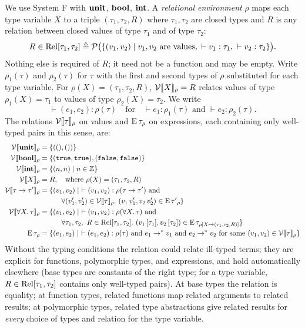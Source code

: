 We use System F with $\mathbf{unit}$, $\mathbf{bool}$, $\mathbf{int}$. A \emph{relational
environment} $\rho$ maps each type variable $X$ to a triple $(\tau_1, \tau_2, R)$ where
$\tau_1, \tau_2$ are closed types and $R$ is any relation between closed values of type
$\tau_1$ and of type $\tau_2$:
\[
R \in \mathrm{Rel}[\tau_1, \tau_2] \triangleq \mathcal{P}\big(\{(v_1, v_2) \mid v_1, v_2 \text{ are values},\ \vdash v_1 : \tau_1,\ \vdash v_2 : \tau_2\}\big).
\]
Nothing else is required of $R$; it need not be a function and may be empty. Write
$\rho_1(\tau)$ and $\rho_2(\tau)$ for $\tau$ with the first and second types of $\rho$
substituted for each type variable. For $\rho(X) = (\tau_1, \tau_2, R)$,
$\mathcal{V}[\![X]\!]_\rho = R$ relates values of type $\rho_1(X) = \tau_1$ to values of type
$\rho_2(X) = \tau_2$. We write
\[
\vdash (e_1, e_2) : \rho(\tau) \quad\text{for}\quad \vdash e_1 : \rho_1(\tau) \text{ and } \vdash e_2 : \rho_2(\tau).
\]
The relations $\mathcal{V}[\![\tau]\!]_\rho$ on values and $\operatorname{E}{\tau}_\rho$ on expressions, each
containing only well-typed pairs in this sense, are:
\begin{align*}
\V{\kw{unit}}_\rho &= \{((), ())\} \\
\V{\kw{bool}}_\rho &= \{(\ttkw{true}, \ttkw{true}), (\ttkw{false}, \ttkw{false})\} \\
\V{\kw{int}}_\rho &= \{(n, n) \mid n \in \Z\} \\
\V{X}_\rho &= R, \quad \text{where } \rho(X) = (\tau_1, \tau_2, R) \\
\V{\tau \to \tau'}_\rho &= \{(v_1, v_2) \mid\ \vdash (v_1, v_2) : \rho(\tau \to \tau') \text{ and } \\
  &\qquad\quad \forall (v_1', v_2') \in \V{\tau}_\rho.\ (v_1\, v_1', v_2\, v_2') \in \E{\tau'}_\rho\} \\
\V{\forall X.\, \tau}_\rho &= \{(v_1, v_2) \mid\ \vdash (v_1, v_2) : \rho(\forall X.\, \tau) \text{ and } \\
  &\qquad\quad \forall \tau_1, \tau_2,\ R \in \Rel[\tau_1, \tau_2].\ (v_1\,[\tau_1], v_2\,[\tau_2]) \in \E{\tau}_{\rho[X \mapsto (\tau_1, \tau_2, R)]}\} \\
\E{\tau}_\rho &= \{(e_1, e_2) \mid\ \vdash (e_1, e_2) : \rho(\tau) \text{ and } e_1 \to^* v_1 \text{ and } e_2 \to^* v_2 \text{ for some } (v_1, v_2) \in \V{\tau}_\rho\}
\end{align*}
Without the typing conditions the relation could relate ill-typed terms; they are
explicit for functions, polymorphic types, and expressions, and hold automatically
elsewhere (base types are constants of the right type; for a type variable, $R \in
\mathrm{Rel}[\tau_1, \tau_2]$ contains only well-typed pairs). At base types the relation is
equality; at function types, related functions map related arguments to related results;
at polymorphic types, related type abstractions give related results for \emph{every}
choice of types and relation for the type variable.
 

